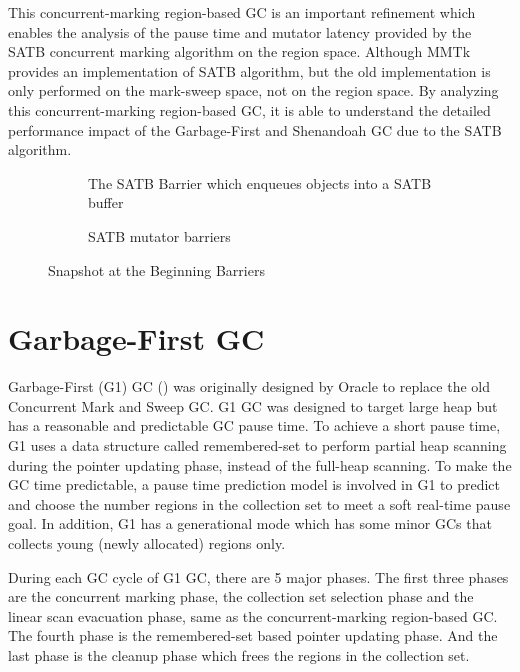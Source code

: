 This concurrent-marking region-based GC is an important refinement which enables
the analysis of the pause time and mutator latency provided by the SATB concurrent marking algorithm on the region space.
Although MMTk provides an implementation of SATB algorithm, but the old implementation
is only performed on the mark-sweep space, not on the region space.
By analyzing this concurrent-marking region-based GC, it is able to understand the
detailed performance impact of the Garbage-First and Shenandoah GC due to the SATB algorithm.

\begin{figure}
  \centering
  \begin{subfigure}[a]{\textwidth}
    
    \caption{The SATB Barrier which enqueues objects into a SATB buffer}
    \label{fig:c:hello}
  \end{subfigure}

  \begin{subfigure}[b]{\textwidth}
    
    \caption{SATB mutator barriers}
    \label{fig:c:hello}
  \end{subfigure}

  \caption{Snapshot at the Beginning Barriers}
  \label{fig:satbbarrier}
\end{figure}

\section{Garbage-First GC}

Garbage-First (G1) GC (\cite{detlefs2004garbage}) was originally designed by Oracle to replace
the old Concurrent Mark and Sweep GC. G1 GC was designed to target large heap but
has a reasonable and predictable GC pause time. To achieve a short pause time, G1
uses a data structure called remembered-set to perform partial heap scanning during the
pointer updating phase, instead of the full-heap scanning. To make the GC time predictable,
a pause time prediction model is involved in G1 to predict and choose the number regions in the
collection set to meet a soft real-time pause goal. In addition, G1 has a generational
mode which has some minor GCs that collects young (newly allocated) regions only.

During each GC cycle of G1 GC, there are 5 major phases.
The first three phases are the concurrent marking phase, the collection
set selection phase and the linear scan evacuation phase,
same as the concurrent-marking region-based GC.
The fourth phase is the remembered-set based pointer updating phase.
And the last phase is the cleanup phase which frees the regions in the collection set.

